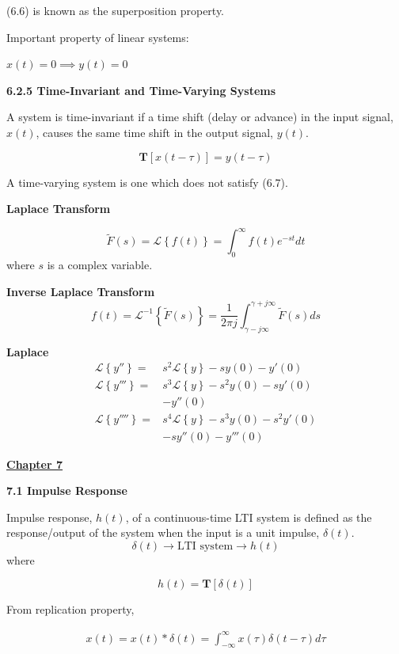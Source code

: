 \documentclass[landscape,a4paper]{extarticle}
\newcommand{\T}{\textbf{T}}
\newcommand{\lap}[1]{\mathcal{L}\left\{#1\right\}}
\newcommand{\invlap}[1]{\mathcal{L}^{-1}\left\{#1\right\}}
\begin{document}
\begin{multicols*}{5}
    (6.6) is known as the superposition property.

    Important property of linear systems: 
    
    $x(t) = 0 \implies y(t) = 0$

    \textbf{6.2.5 Time-Invariant and Time-Varying Systems}

    A system is time-invariant if a time shift (delay or advance) in the input signal, $x(t)$, causes the same time shift in the output signal, $y(t)$.

    \[
        \T[x(t-\tau)] = y(t-\tau) \tag{6.7}
    \]

    A time-varying system is one which does not satisfy (6.7).

    \textbf{Laplace Transform}

    \[
        \tilde{F}(s) = \lap{f(t)} = \int_{0}^{\infty}f(t)e^{-st} dt \tag{6.8}
    \]
    where $s$ is a complex variable.

    \textbf{Inverse Laplace Transform}
    \[
        f(t) = \invlap{\tilde{F}(s)} = \frac{1}{2\pi j} \int_{\gamma - j \infty}^{\gamma + j \infty}\tilde{F}(s)ds \tag{6.9}
    \]
    
    \textbf{Laplace}
    \begin{align*}
        \lap{y''} = {}&s^2 \lap{y} - sy(0) - y'(0)\\
        \lap{y'''} = {}&s^3 \lap{y} - s^2 y(0) - s y'(0)\\
                    &- y''(0)\\
        \lap{y''''} = {}&s^4\lap{y} - s^3y(0) - s^2 y'(0)\\ 
                    &- s y''(0) - y'''(0)
    \end{align*}

    \textbf{\uline{Chapter 7}}

    \textbf{7.1 Impulse Response}

    Impulse response, $h(t)$, of a continuous-time LTI system is defined as the response/output of the system when the input is a unit impulse, $\delta(t)$.
    \[
        \delta(t) \rightarrow \text{LTI system} \rightarrow h(t)
    \]
    where 

    \[
        h(t) = \T[\delta(t)] \tag{7.1}
    \]

    From replication property, 

    \begin{align*}
        x(t) = x(t) * \delta (t) = \int_{-\infty}^{\infty}x(\tau)\delta(t-\tau) d\tau \tag{7.2}
    \end{align*}


\end{multicols*}
\end{document}
